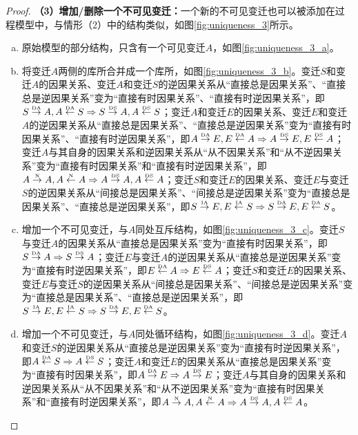 \begin{proof}
\textbf{（3）增加/删除一个不可见变迁：}一个新的不可见变迁也可以被添加在过程模型中，与情形（2）中的结构类似，如图\ref{fig:uniqueness_3}所示。
\begin{enumerate}[(a)]
  \item 原始模型的部分结构，只含有一个可见变迁$A$，如图\ref{fig:uniqueness_3_a}。
  \item 将变迁$A$两侧的库所合并成一个库所，如图\ref{fig:uniqueness_3_b}。变迁$S$和变迁$A$的因果关系、变迁$A$和变迁$S$的逆因果关系从“直接总是因果关系”、“直接总是逆因果关系”变为“直接有时因果关系”、“直接有时逆因果关系”，即$S\overset{\text{\tiny{DA}}}{\rightarrow}A,A\overset{\text{\tiny{DA}}}{\leftarrow}S\Rightarrow S\overset{\text{\tiny{DS}}}{\rightarrow}A,A\overset{\text{\tiny{DS}}}{\leftarrow}S$；变迁$A$和变迁$E$的因果关系、变迁$E$和变迁$A$的逆因果关系从“直接总是因果关系”、“直接总是逆因果关系”变为“直接有时因果关系”、“直接有时逆因果关系”，即$A\overset{\text{\tiny{DA}}}{\rightarrow}E,E\overset{\text{\tiny{DA}}}{\leftarrow}A\Rightarrow A\overset{\text{\tiny{DS}}}{\rightarrow}E,E\overset{\text{\tiny{DS}}}{\leftarrow}A$；变迁$A$与其自身的因果关系和逆因果关系从“从不因果关系”和“从不逆因果关系”变为“直接有时因果关系”和“直接有时逆因果关系”，即$A\overset{\text{\tiny{N}}}{\rightarrow}A,A\overset{\text{\tiny{N}}}{\leftarrow}A\Rightarrow A\overset{\text{\tiny{DS}}}{\rightarrow}A,A\overset{\text{\tiny{DS}}}{\leftarrow}A$；变迁$S$和变迁$E$的因果关系、变迁$E$与变迁$S$的逆因果关系从“间接总是因果关系”、“间接总是逆因果关系”变为“直接总是因果关系”、“直接总是逆因果关系”，即$S\overset{\text{\tiny{IA}}}{\rightarrow}E,E\overset{\text{\tiny{IA}}}{\leftarrow}S\Rightarrow S\overset{\text{\tiny{DA}}}{\rightarrow}E,E\overset{\text{\tiny{DA}}}{\leftarrow}S$。
  \item 增加一个不可见变迁，与$A$同处互斥结构，如图\ref{fig:uniqueness_3_c}。变迁$S$与变迁$A$的因果关系从“直接总是因果关系”变为“直接有时因果关系”，即$S\overset{\text{\tiny{DA}}}{\rightarrow}A\Rightarrow S\overset{\text{\tiny{DS}}}{\rightarrow}A$；变迁$E$与变迁$A$的逆因果关系从“直接总是逆因果关系”变为“直接有时逆因果关系”，即$E\overset{\text{\tiny{DA}}}{\leftarrow}A\Rightarrow E\overset{\text{\tiny{DS}}}{\leftarrow}A$；变迁$S$和变迁$E$的因果关系、变迁$E$与变迁$S$的逆因果关系从“间接总是因果关系”、“间接总是逆因果关系”变为“直接总是因果关系”、“直接总是逆因果关系”，即$S\overset{\text{\tiny{IA}}}{\rightarrow}E,E\overset{\text{\tiny{IA}}}{\leftarrow}S\Rightarrow S\overset{\text{\tiny{DA}}}{\rightarrow}E,E\overset{\text{\tiny{DA}}}{\leftarrow}S$。
  \item 增加一个不可见变迁，与$A$同处循环结构，如图\ref{fig:uniqueness_3_d}。变迁$A$和变迁$S$的逆因果关系从“直接总是逆因果关系”变为“直接有时逆因果关系”，即$A\overset{\text{\tiny{DA}}}{\leftarrow}S\Rightarrow A\overset{\text{\tiny{DS}}}{\leftarrow}S$；变迁$A$和变迁$E$的因果关系从“直接总是因果关系”变为“直接有时因果关系”，即$A\overset{\text{\tiny{DA}}}{\rightarrow}E\Rightarrow A\overset{\text{\tiny{DS}}}{\rightarrow}E$；变迁$A$与其自身的因果关系和逆因果关系从“从不因果关系”和“从不逆因果关系”变为“直接有时因果关系”和“直接有时逆因果关系”，即$A\overset{\text{\tiny{N}}}{\rightarrow}A,A\overset{\text{\tiny{N}}}{\leftarrow}A\Rightarrow A\overset{\text{\tiny{DS}}}{\rightarrow}A,A\overset{\text{\tiny{DS}}}{\leftarrow}A$。

\end{enumerate}
\end{proof}
